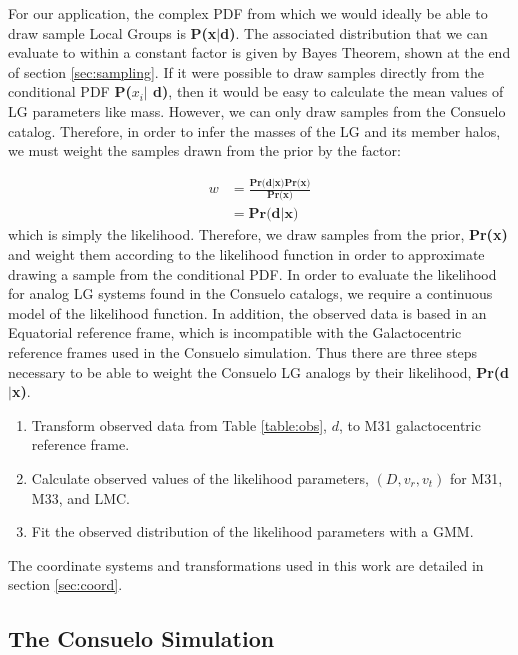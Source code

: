 \documentclass[iop,apj,twocolappendix,numberedappendix]{emulateapj}
\newcommand{\LikePR}{\textbf{Pr(d$\vert$x)}}
\newcommand{\consuelo}{{\sc Consuelo }}
\begin{document}
\par
For our application, the complex PDF from which we would ideally be able to draw sample Local Groups is \textbf{P(x$\vert$d)}. The associated distribution that we can evaluate to within a constant factor is given by Bayes Theorem, shown at the end of section 
\ref{sec:sampling}. 
If it were possible to draw samples directly from the conditional PDF \textbf{P($x_{i}\vert$ d)}, then it would be easy to calculate the mean values of LG parameters like mass. However, we can only draw samples from the \consuelo catalog.  Therefore, in order to infer the masses of the LG and its member halos, we must weight the samples drawn from the prior by the factor:


\begin{equation}
\begin{aligned}
w &= \frac{\textbf{Pr(d$\vert$x)Pr(x)}}{\textbf{Pr(x)}} \\
 &= \textbf{Pr(d$\vert$x)}
\end{aligned}
\end{equation}
which is simply the likelihood. Therefore, we draw samples from the prior, \textbf{Pr(x)} and weight them according to the likelihood function in order to approximate drawing a sample from the conditional PDF. In order to evaluate the likelihood for analog LG systems found in the \consuelo catalogs, we require a continuous model of the likelihood function.  In addition, the observed data is based in an Equatorial reference frame, which is incompatible with the Galactocentric reference frames used in the \consuelo simulation.  Thus there are three steps necessary to be able to weight the \consuelo LG analogs by their likelihood, \LikePR.  
\begin{enumerate}
\item Transform observed data from Table 
\ref{table:obs}, 
\textbf{$d$}, to M31 galactocentric reference frame.
\item Calculate observed values of the likelihood parameters, $(D, v_{r}, v_{t})$ for M31, M33, and LMC.
\item Fit the observed distribution of the likelihood parameters with a GMM.
\end{enumerate}
The coordinate systems and transformations used in this work are detailed in section 
\ref{sec:coord}.





\subsection{The \consuelo Simulation}
\label{sec:sampling_b}
\end{document}
